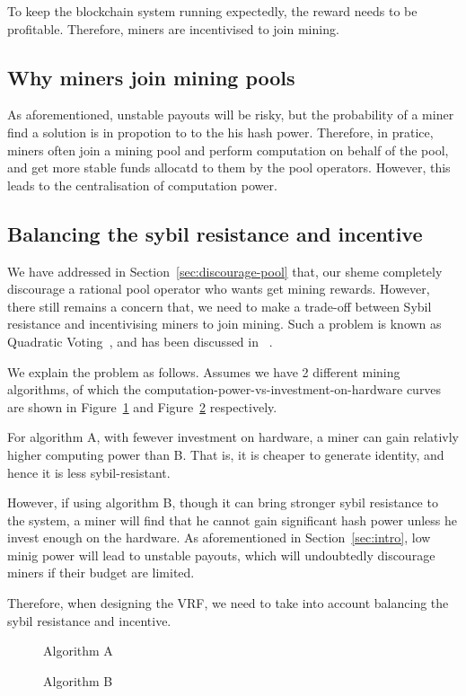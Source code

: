To keep the blockchain system running expectedly, the reward needs to be profitable.
Therefore, miners are incentivised to join mining.

\subsection{Why miners join mining pools}

As aforementioned, unstable payouts will be risky, but the probability of a miner find a solution is in propotion to to the his hash power.
Therefore, in pratice, miners often join a mining pool and perform computation on behalf of the pool, and get more stable funds allocatd to them by the pool operators.
However, this leads to the centralisation of computation power.

\subsection{Balancing the sybil resistance and incentive}

We have addressed in Section~\ref{sec:discourage-pool} that, our sheme completely discourage a rational pool operator who wants get mining rewards.
However, there still remains a concern that, we need to make a trade-off between Sybil resistance and incentivising miners to join mining.
Such a problem is known as Quadratic Voting~\cite{lalley2018quadratic}, and has been discussed in ~\cite{radical}.

We explain the problem as follows. Assumes we have 2 different mining algorithms, of which the computation-power-vs-investment-on-hardware curves are shown in Figure~\ref{fig:algo_A} and Figure~\ref{fig:algo_B} respectively.

For algorithm A, with fewever investment on hardware, a miner can gain relativly higher computing power than B. That is, it is cheaper to generate identity, and hence it is less sybil-resistant.

However, if using algorithm B, though it can bring stronger sybil resistance to the system, a miner will find that he cannot gain significant hash power unless he invest enough on the hardware.
As aforementioned in Section~\ref{sec:intro}, low minig power will lead to unstable payouts, which will undoubtedly discourage miners if their budget are limited.

Therefore, when designing the VRF, we need to take into account balancing the sybil resistance and incentive.

\begin{figure}
\centering
{}
\caption{Algorithm A}
\label{fig:algo_A}
\end{figure}


\begin{figure}
\centering
{}
\caption{Algorithm B}
\label{fig:algo_B}
\end{figure}
